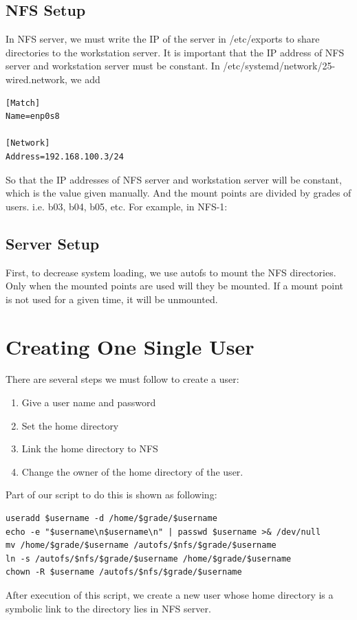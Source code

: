 \documentclass{article}
\begin{document}
\subsection{NFS Setup}
In NFS server, we must write the IP of the server in {\cs /etc/exports} to share directories to the workstation server.
It is important that the IP address of NFS server and workstation server must be constant.
In {\cs /etc/systemd/network/25-wired.network}, we add \\
\begin{verbatim}
[Match]
Name=enp0s8

[Network]
Address=192.168.100.3/24
\end{verbatim}
So that the IP addresses of NFS server and workstation server will be constant, which is the value given manually.
And the mount points are divided by grades of users. i.e. b03, b04, b05, etc. For example, in NFS-1:
\subsection{Server Setup}
First, to decrease system loading, we use {\cs autofs} to mount the NFS directories. Only when the mounted points are used will they be mounted. 
If a mount point is not used for a given time, it will be unmounted. 

\section{Creating One Single User}
There are several steps we must follow to create a user:
   \begin{enumerate}
   \item Give a user name and password
   \item Set the home directory
   \item Link the home directory to NFS
   \item Change the owner of the home directory of the user.
   \end{enumerate}
Part of our script to do this is shown as following:
\begin{framed}
\begin{verbatim}
useradd $username -d /home/$grade/$username
echo -e "$username\n$username\n" | passwd $username >& /dev/null
mv /home/$grade/$username /autofs/$nfs/$grade/$username
ln -s /autofs/$nfs/$grade/$username /home/$grade/$username
chown -R $username /autofs/$nfs/$grade/$username
\end{verbatim}
\end{framed}
After execution of this script, we create a new user whose home directory is a symbolic link to the directory lies in NFS server.
\end{document}
